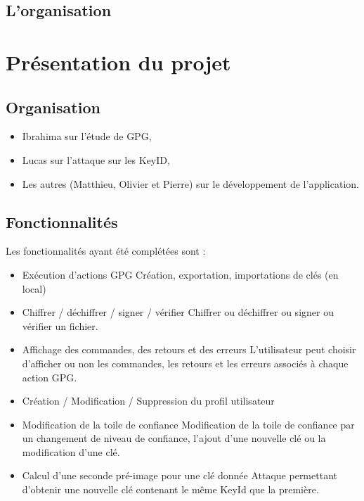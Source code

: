 \documentclass{../res/univ-projet}
\begin{document}
  \subsection{L'organisation}
    

\section{Présentation du projet}
    \subsection{Organisation}
    
    
    \begin{itemize}
      \item Ibrahima sur l'étude de GPG,
      \item Lucas sur l'attaque sur les KeyID,
      \item Les autres (Matthieu, Olivier et Pierre) sur le développement de l'application.
    \end{itemize}

  \subsection{Fonctionnalités}
    Les fonctionnalités ayant été complétées sont :\medbreak
  \begin{itemize}
  \item Exécution d'actions GPG \smallbreak
  Création, exportation, importations de clés (en local)\smallbreak
  \item Chiffrer / déchiffrer / signer / vérifier \smallbreak
  Chiffrer ou déchiffrer ou signer ou vérifier un fichier. \smallbreak
  \item Affichage des commandes, des retours et des erreurs \smallbreak
  L'utilisateur peut choisir d'afficher ou non les commandes, les retours et les erreurs associés à chaque action GPG. \smallbreak 
  \item Création / Modification / Suppression du profil utilisateur \smallbreak
  \item Modification de la toile de confiance \smallbreak
  Modification de la toile de confiance par un changement de niveau de confiance, l'ajout d'une nouvelle clé ou la modification d'une clé. \smallbreak
  \item Calcul d'une seconde pré-image pour une clé donnée \smallbreak
  Attaque permettant d'obtenir une nouvelle clé contenant le même KeyId que la première.
  \end{itemize}
\end{document}
